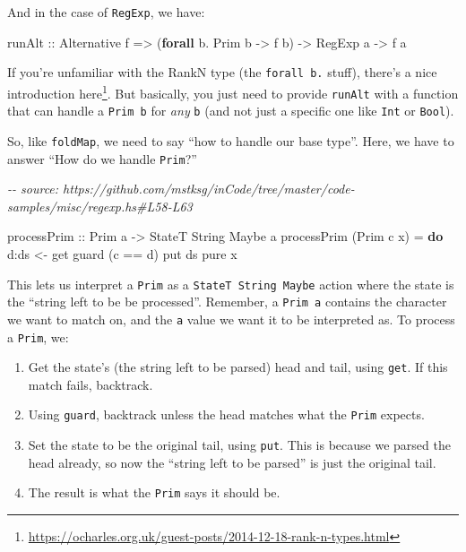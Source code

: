 \documentclass[]{article}
\newenvironment{Shaded}{}{}
\newcommand{\CommentTok}[1]{\textcolor[rgb]{0.38,0.63,0.69}{\textit{#1}}}
\newcommand{\DataTypeTok}[1]{\textcolor[rgb]{0.56,0.13,0.00}{#1}}
\newcommand{\FunctionTok}[1]{\textcolor[rgb]{0.02,0.16,0.49}{#1}}
\newcommand{\KeywordTok}[1]{\textcolor[rgb]{0.00,0.44,0.13}{\textbf{#1}}}
\newcommand{\NormalTok}[1]{#1}
\newcommand{\OperatorTok}[1]{\textcolor[rgb]{0.40,0.40,0.40}{#1}}
\newcommand{\OtherTok}[1]{\textcolor[rgb]{0.00,0.44,0.13}{#1}}
\renewcommand{\href}[2]{#2\footnote{\url{#1}}}
\begin{document}
And in the case of \texttt{RegExp}, we have:

\begin{Shaded}
\begin{Highlighting}[]
\OtherTok{runAlt ::} \DataTypeTok{Alternative}\NormalTok{ f}
       \OtherTok{=>}\NormalTok{ (}\KeywordTok{forall}\NormalTok{ b}\OperatorTok{.} \DataTypeTok{Prim}\NormalTok{ b }\OtherTok{{-}>}\NormalTok{ f b)}
       \OtherTok{{-}>} \DataTypeTok{RegExp}\NormalTok{ a}
       \OtherTok{{-}>}\NormalTok{ f a}
\end{Highlighting}
\end{Shaded}

If you're unfamiliar with the RankN type (the \texttt{forall\ b.} stuff),
there's a
\href{https://ocharles.org.uk/guest-posts/2014-12-18-rank-n-types.html}{nice
introduction here}. But basically, you just need to provide \texttt{runAlt} with
a function that can handle a \texttt{Prim\ b} for \emph{any} \texttt{b} (and not
just a specific one like \texttt{Int} or \texttt{Bool}).

So, like \texttt{foldMap}, we need to say ``how to handle our base type''. Here,
we have to answer ``How do we handle \texttt{Prim}?''

\begin{Shaded}
\begin{Highlighting}[]
\CommentTok{{-}{-} source: https://github.com/mstksg/inCode/tree/master/code{-}samples/misc/regexp.hs\#L58{-}L63}

\OtherTok{processPrim ::} \DataTypeTok{Prim}\NormalTok{ a }\OtherTok{{-}>} \DataTypeTok{StateT} \DataTypeTok{String} \DataTypeTok{Maybe}\NormalTok{ a}
\NormalTok{processPrim (}\DataTypeTok{Prim}\NormalTok{ c x) }\OtherTok{=} \KeywordTok{do}
\NormalTok{    d}\OperatorTok{:}\NormalTok{ds }\OtherTok{<{-}}\NormalTok{ get}
\NormalTok{    guard (c }\OperatorTok{==}\NormalTok{ d)}
\NormalTok{    put ds}
    \FunctionTok{pure}\NormalTok{ x}
\end{Highlighting}
\end{Shaded}

This lets us interpret a \texttt{Prim} as a \texttt{StateT\ String\ Maybe}
action where the state is the ``string left to be be processed''. Remember, a
\texttt{Prim\ a} contains the character we want to match on, and the \texttt{a}
value we want it to be interpreted as. To process a \texttt{Prim}, we:

\begin{enumerate}
\def\labelenumi{\arabic{enumi}.}
\tightlist
\item
  Get the state's (the string left to be parsed) head and tail, using
  \texttt{get}. If this match fails, backtrack.
\item
  Using \texttt{guard}, backtrack unless the head matches what the \texttt{Prim}
  expects.
\item
  Set the state to be the original tail, using \texttt{put}. This is because we
  parsed the head already, so now the ``string left to be parsed'' is just the
  original tail.
\item
  The result is what the \texttt{Prim} says it should be.
\end{enumerate}
\end{document}
